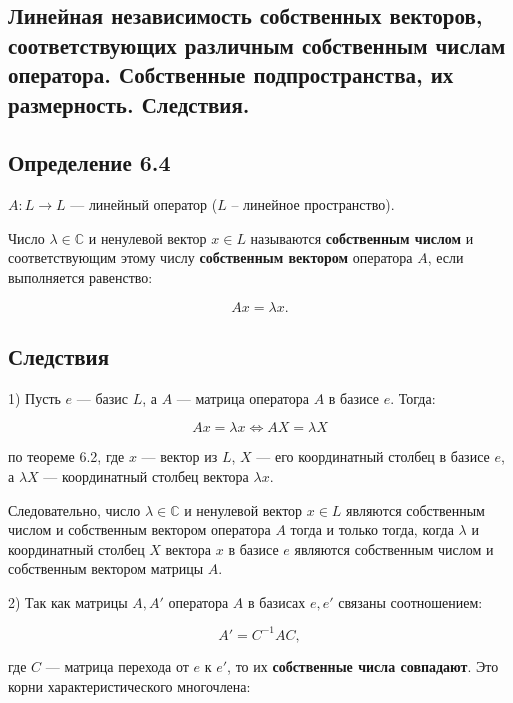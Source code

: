 {
\subsection{Линейная независимость собственных векторов, соответствующих различным собственным числам оператора. Собственные подпространства, их размерность. Следствия.}

\subsection*{Определение 6.4}

\( A : L \to L \) — линейный оператор (\( L \) – линейное пространство).

Число \( \lambda \in \mathbb{C} \) и ненулевой вектор \( x \in L \) называются \textbf{собственным числом} и соответствующим этому числу \textbf{собственным вектором} оператора \( A \), если выполняется равенство:



\[
A x = \lambda x.
\]



\subsection*{Следствия}

1) Пусть \( e \) — базис \( L \), а \( A \) — матрица оператора \( A \) в базисе \( e \). Тогда:



\[
A x = \lambda x \iff A X = \lambda X
\]



по теореме 6.2, где \( x \) — вектор из \( L \), \( X \) — его координатный столбец в базисе \( e \), а \( \lambda X \) — координатный столбец вектора \( \lambda x \).

Следовательно, число \( \lambda \in \mathbb{C} \) и ненулевой вектор \( x \in L \) являются собственным числом и собственным вектором оператора \( A \) тогда и только тогда, когда \( \lambda \) и координатный столбец \( X \) вектора \( x \) в базисе \( e \) являются собственным числом и собственным вектором матрицы \( A \).

2) Так как матрицы \( A, A' \) оператора \( A \) в базисах \( e, e' \) связаны соотношением:



\[
A' = C^{-1} A C,
\]



где \( C \) — матрица перехода от \( e \) к \( e' \), то их \textbf{собственные числа совпадают}. Это корни характеристического многочлена:



}
